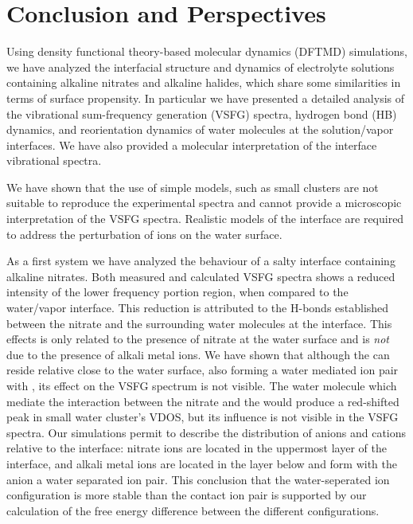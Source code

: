 \chapter{Conclusion and Perspectives}\label{CHAPTER_Summary}
Using density functional theory-based molecular dynamics (DFTMD) simulations, we have analyzed the interfacial structure and dynamics of electrolyte solutions containing alkaline nitrates and alkaline halides,
which share some similarities in terms of surface propensity.
In particular we have presented a detailed analysis of the vibrational sum-frequency generation (VSFG) spectra, hydrogen bond (HB) dynamics, and reorientation dynamics of water molecules at the solution/vapor interfaces. 
We have also provided a molecular interpretation of the interface vibrational spectra. 

We have shown that the use of simple models, such as small clusters are not suitable to reproduce the experimental spectra 
and cannot provide a microscopic interpretation of the VSFG spectra. Realistic models of the interface are required to address the 
perturbation of ions on the water surface. 

As a first system we have analyzed the behaviour of a salty interface containing alkaline nitrates.
Both measured and calculated VSFG spectra shows a reduced intensity of the lower frequency portion region, 
when compared to the water/vapor interface. 
This reduction is attributed to the H-bonds established between the nitrate and the surrounding water molecules at the interface.
This effects is only related to the presence of nitrate at the water surface and is \emph{not} due to the presence of alkali metal ions.
We have shown that although the \Li can reside relative close to the water surface, also forming a water mediated
ion pair with \nit, its effect on the VSFG spectrum is not visible. The water molecule which mediate the interaction 
between the nitrate and the \Li would produce a red-shifted peak in small water cluster's VDOS, but its influence is not visible 
in the VSFG spectra. Our simulations permit to describe the distribution of anions and cations relative to the interface: 
nitrate ions are located in the uppermost layer of the interface, and alkali metal ions are located in the layer below 
and form with the anion a water separated ion pair.
This conclusion that the water-seperated ion configuration is more stable than the contact ion pair is supported by our calculation of the free energy difference between the different configurations. 


